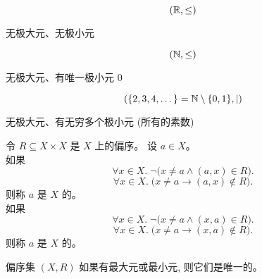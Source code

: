 \begin{frame}{}
  \begin{exampleblock}{}
    \[
      (\mathbb{R}, \le)
    \]
    \pause
    \begin{center}
      无极大元、无极小元
    \end{center}
  \end{exampleblock}

  \pause
  \begin{exampleblock}{}
    \[
      (\mathbb{N}, \le)
    \]
    \pause
    \begin{center}
      无极大元、有唯一极小元 $0$
    \end{center}
  \end{exampleblock}

  \pause
  \begin{exampleblock}{}
    \[
      (\{2, 3, 4, \dots\} = \mathbb{N} \setminus \{0, 1\}, \mid)
    \]
    \pause
    \begin{center}
      无极大元、有无穷多个极小元 (所有的素数)
    \end{center}
  \end{exampleblock}
\end{frame}

\begin{frame}{}
  \begin{definition}
    令 $R \subseteq X \times X$ 是 $X$ 上的偏序。
    设 $a \in X$。\\[5pt]

    \pause
    如果
    \[
      \forall x \in X.\; \lnot \big(x \neq a \land (a, x) \in R \big).
    \]
    \[
      \forall x \in X.\; \big(x \neq a \to (a, x) \notin R \big).
    \]
    则称 $a$ 是 $X$ 的。\\[10pt]

    \pause
    如果
    \[
      \forall x \in X.\; \lnot \big(x \neq a \land (x, a) \in R \big).
    \]
    \[
      \forall x \in X.\; \big(x \neq a \to (x, a) \notin R \big).
    \]
    则称 $a$ 是 $X$ 的。
  \end{definition}

  \pause
  \begin{center}
  \end{center}
\end{frame}

\begin{frame}{}
  \begin{theorem}
    偏序集 $(X, R)$ 如果有最大元或最小元, 则它们是唯一的。
  \end{theorem}
\end{frame}
